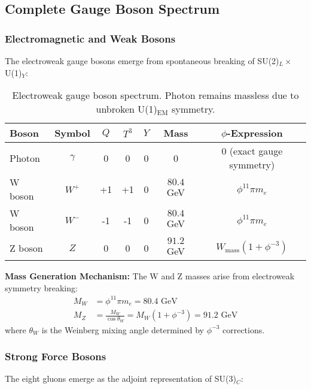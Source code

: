 \subsection{Complete Gauge Boson Spectrum}

\subsubsection{Electromagnetic and Weak Bosons}

The electroweak gauge bosons emerge from spontaneous breaking of SU(2)$_L \times$ U(1)$_Y$:

\begin{table}[H]
\centering
\begin{tabular}{|l|c|c|c|c|c|c|}
\hline
\textbf{Boson} & \textbf{Symbol} & \textbf{$Q$} & \textbf{$T^3$} & \textbf{$Y$} & \textbf{Mass} & \textbf{$\phi$-Expression} \\
\hline
Photon & $\gamma$ & 0 & 0 & 0 & 0 & 0 (exact gauge symmetry) \\
W boson & $W^+$ & +1 & +1 & 0 & $80.4$ GeV & $\phi^{11} \pi m_e$ \\
W boson & $W^-$ & -1 & -1 & 0 & $80.4$ GeV & $\phi^{11} \pi m_e$ \\
Z boson & $Z$ & 0 & 0 & 0 & $91.2$ GeV & $W_{\text{mass}} (1 + \phi^{-3})$ \\
\hline
\end{tabular}
\caption{Electroweak gauge boson spectrum. Photon remains massless due to unbroken U(1)$_{\text{EM}}$ symmetry.}
\end{table}

\textbf{Mass Generation Mechanism:}
The W and Z masses arise from electroweak symmetry breaking:
\begin{align}
M_W &= \phi^{11} \pi m_e = 80.4 \text{ GeV}\\
M_Z &= \frac{M_W}{\cos \theta_W} = M_W (1 + \phi^{-3}) = 91.2 \text{ GeV}
\end{align}
where $\theta_W$ is the Weinberg mixing angle determined by $\phi^{-3}$ corrections.

\subsubsection{Strong Force Bosons}

The eight gluons emerge as the adjoint representation of SU(3)$_C$:

